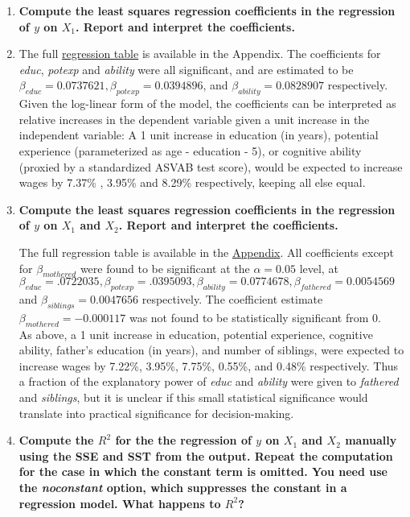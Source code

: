 \documentclass{article}
\begin{document}
\begin{enumerate}[label=\alph*.]
\item \textbf{Compute the least squares regression coefficients in the regression of $y$ on $X_1$. Report and interpret the coefficients.}
\item 
The full \hyperref[sec:table1]{regression table} is available in the Appendix. The coefficients for \textit{educ}, \textit{potexp} and \textit{ability} were all significant, and are estimated to be $\beta_{educ} = 0.0737621, \beta_{potexp}=0 .0394896$, and $\beta_{ability}= 0.0828907 $ respectively. \\

Given the log-linear form of the model, the coefficients can be interpreted as relative increases in the dependent variable given a unit increase in the independent variable: A 1 unit increase in education (in years), potential experience (parameterized as age - education - 5), or cognitive ability (proxied by a standardized ASVAB test score), would be expected to increase wages by 7.37\% , 3.95\% and 8.29\% respectively, keeping all else equal.

\item \textbf{Compute the least squares regression coefficients in the regression of $y$  on $X_1$ and $X_2$. Report and interpret the coefficients.}

The full regression table is available in the \hyperref[sec:table2]{Appendix}. All coefficients except for $\beta_{mothered}$ were found to be significant at the $\alpha = 0.05$ level, at $\beta_{educ} = .0722035, \beta_{potexp} = .0395093, \beta_{ability} = 0.0774678, \beta_{fathered} = 0.0054569$ and $\beta_{siblings} = 0.0047656 $ respectively. The coefficient estimate $\beta_{mothered} = -0.000117 $ was not found to be statistically significant from 0. \\

As above, a 1 unit increase in education, potential experience, cognitive ability, father's education (in years), and number of siblings, were expected to increase wages by 7.22\%, 3.95\%, 7.75\%, 0.55\%, and 0.48\% respectively. Thus a fraction of the explanatory power of \textit{educ} and \textit{ability} were given to \textit{fathered} and \textit{siblings}, but it is unclear if this small statistical significance would translate into practical significance for decision-making.

\newpage
\item \textbf{Compute the $R^2$ for the the regression of $y$ on $X_1$ and $X_2$ manually using the SSE and SST from the output. Repeat the computation for the case in which the constant term is omitted. You need use the \textit{noconstant} option, which suppresses the constant in a regression model. What happens to $R^2$?}


\end{enumerate}
\end{document}
